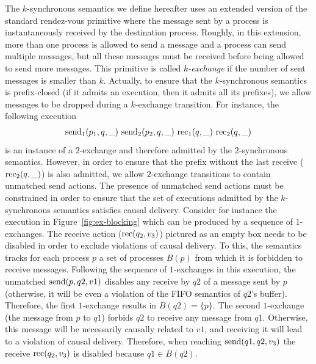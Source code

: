 The $k$-synchronous semantics we define hereafter uses an extended version of the standard rendez-vous primitive where the message sent by a process is instantaneously received by the destination process. Roughly, in this extension, more than one process is allowed to send a message and a process can send multiple messages, but all these messages must be received before being allowed to send more messages. This primitive is called \emph{$k$-exchange} if the number of sent messages is smaller than $k$. Actually, to ensure that the $k$-synchronous semantics is prefix-closed (if it admits an execution, then it admits all its prefixes), we allow messages to be dropped during a $k$-exchange transition. For instance, the following execution 
\begin{align*}
\send{1}{p_1,q,\_}\ 
\send{2}{p_2,q,\_}\ 
\rec{1}{q,\_}\ 
\rec{2}{q,\_} 
\end{align*}
is an instance of a $2$-exchange and therefore admitted by the $2$-synchronous semantics. However, in order to ensure that the prefix without the last receive ($\mathrm{rec}_{2}({q,\_})$) is also admitted, we allow $2$-exchange transitions to contain unmatched send actions. The presence of unmatched send actions must be constrained in order to ensure that the set of executions admitted by the $k$-synchronous semantics satisfies causal delivery. Consider for instance the execution in Figure~\ref{fig:ex-blocking} which can be produced by a sequence of $1$-exchanges. The receive action ($\mathrm{rec}({q_2,v_3})$) pictured as an empty box needs to be disabled in order to exclude violations of causal delivery. To this, the semantics tracks for each process $p$ a set of processes $B(p)$ from which it is forbidden to receive messages. Following the sequence of $1$-exchanges in this execution, the unmatched $\mathrm{send}({p,q2,v1})$ disables any receive by $q2$ of a message sent by $p$ (otherwise, it will be even a violation of the FIFO semantics of $q2$'s buffer). Therefore, the first $1$-exchange results in $B(q2)=\{p\}$. The second $1$-exchange (the message from $p$ to $q1$) forbids $q2$ to receive any message from $q1$. Otherwise, this message will be necessarily causally related to $v1$, and receiving it will lead to a violation of causal delivery. Therefore, when reaching $\mathrm{send}({q1,q2,v_3})$ the receive $\mathrm{rec}({q_2,v_3})$ is disabled because $q1\in B(q2)$.



